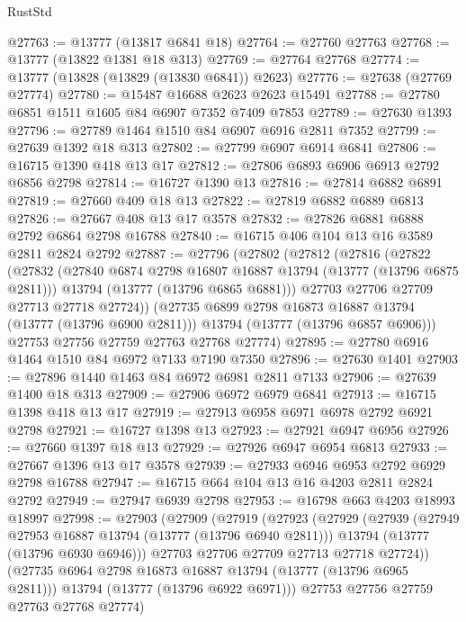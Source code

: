 \begin{lexlean}{RustStd}
\begin{coremodule}
@27763 := @13777 (@13817 @6841 @18)
@27764 := @27760 @27763
@27768 := @13777 (@13822 @1381 @18 @313)
@27769 := @27764 @27768
@27774 := @13777 (@13828 (@13829 (@13830 @6841)) @2623)
@27776 := @27638 (@27769 @27774)
@27780 := @15487 @16688 @2623 @2623 @15491
@27788 := @27780 @6851 @1511 @1605 @84 @6907 @7352 @7409 @7853
@27789 := @27630 @1393
@27796 := @27789 @1464 @1510 @84 @6907 @6916 @2811 @7352
@27799 := @27639 @1392 @18 @313
@27802 := @27799 @6907 @6914 @6841
@27806 := @16715 @1390 @418 @13 @17
@27812 := @27806 @6893 @6906 @6913 @2792 @6856 @2798
@27814 := @16727 @1390 @13
@27816 := @27814 @6882 @6891
@27819 := @27660 @409 @18 @13
@27822 := @27819 @6882 @6889 @6813
@27826 := @27667 @408 @13 @17 @3578
@27832 := @27826 @6881 @6888 @2792 @6864 @2798 @16788
@27840 := @16715 @406 @104 @13 @16 @3589 @2811 @2824 @2792
@27887 := @27796
    (@27802
      (@27812
        (@27816
          (@27822
            (@27832
              (@27840 @6874 @2798 @16807 @16887 @13794 (@13777 (@13796 @6875 @2811)))
              @13794
              (@13777 (@13796 @6865 @6881)))
            @27703
            @27706
            @27709
            @27713
            @27718
            @27724))
        (@27735 @6899 @2798 @16873 @16887 @13794 (@13777 (@13796 @6900 @2811)))
        @13794
        (@13777 (@13796 @6857 @6906)))
      @27753
      @27756
      @27759
      @27763
      @27768
      @27774)
@27895 := @27780 @6916 @1464 @1510 @84 @6972 @7133 @7190 @7350
@27896 := @27630 @1401
@27903 := @27896 @1440 @1463 @84 @6972 @6981 @2811 @7133
@27906 := @27639 @1400 @18 @313
@27909 := @27906 @6972 @6979 @6841
@27913 := @16715 @1398 @418 @13 @17
@27919 := @27913 @6958 @6971 @6978 @2792 @6921 @2798
@27921 := @16727 @1398 @13
@27923 := @27921 @6947 @6956
@27926 := @27660 @1397 @18 @13
@27929 := @27926 @6947 @6954 @6813
@27933 := @27667 @1396 @13 @17 @3578
@27939 := @27933 @6946 @6953 @2792 @6929 @2798 @16788
@27947 := @16715 @664 @104 @13 @16 @4203 @2811 @2824 @2792
@27949 := @27947 @6939 @2798
@27953 := @16798 @663 @4203 @18993 @18997
@27998 := @27903
    (@27909
      (@27919
        (@27923
          (@27929
            (@27939
              (@27949 @27953 @16887 @13794 (@13777 (@13796 @6940 @2811)))
              @13794
              (@13777 (@13796 @6930 @6946)))
            @27703
            @27706
            @27709
            @27713
            @27718
            @27724))
        (@27735 @6964 @2798 @16873 @16887 @13794 (@13777 (@13796 @6965 @2811)))
        @13794
        (@13777 (@13796 @6922 @6971)))
      @27753
      @27756
      @27759
      @27763
      @27768
      @27774)

\end{coremodule}
\end{lexlean}
